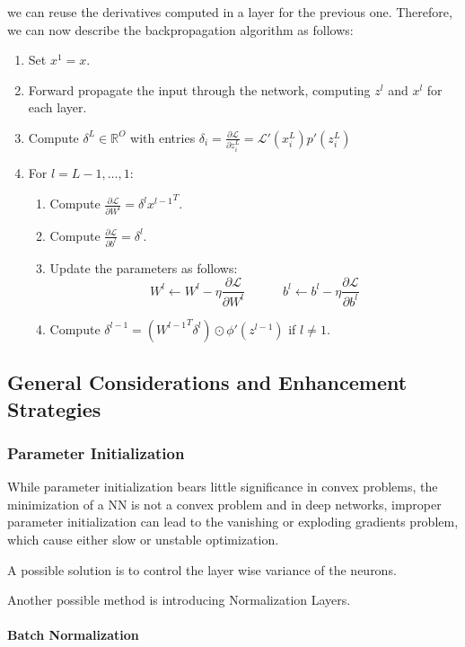 \documentclass{article}
\newcommand{\R}{\mathbb{R}}
\newcommand{\loss}{\mathcal{L}}
\begin{document}
we can reuse the derivatives computed in a layer for the previous one.
Therefore, we can now describe the backpropagation algorithm as follows:
\begin{enumerate}
    \item Set $x^1 = x$.
    \item Forward propagate the input through the network, computing $z^l$ and $x^l$ for each layer.
    \item Compute $\delta^L \in \R^O$ with entries $\delta_i = \frac{\partial \loss}{\partial z^L_i} = \loss'(x^L_i) p'(z^L_i)$
    \item For $l = L-1, \dots, 1$:
    \begin{enumerate}
	\item Compute $\frac{\partial \loss}{\partial W^l} = \delta^l {x^{l-1}}^T$.
	\item Compute $\frac{\partial \loss}{\partial b^l} = \delta^l$.
	\item Update the parameters as follows:
	$$
	W^l \leftarrow W^l - \eta \frac{\partial \loss}{\partial W^l} \quad \quad \quad
	b^l \leftarrow b^l - \eta \frac{\partial \loss}{\partial b^l}
	$$
    \item Compute $\delta^{l-1} = \left( {W^{l-1}}^T \delta^l \right) \odot \phi'(z^{l-1})$ if $l \neq 1$.
    \end{enumerate}
\end{enumerate}

\subsection{General Considerations and Enhancement Strategies}

\subsubsection{Parameter Initialization}

While parameter initialization bears little significance in convex problems, the minimization of a NN is not a convex problem and in deep networks, improper parameter initialization can lead to the vanishing or exploding gradients problem, which cause either slow or unstable optimization.

A possible solution is to control the layer wise variance of the neurons.

Another possible method is introducing Normalization Layers.

\paragraph{Batch Normalization}
\end{document}
